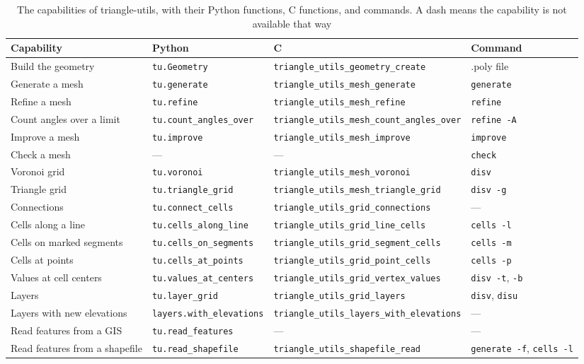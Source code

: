 \documentclass[11pt,twoside,twocolumn]{usgsreport}
\begin{document}
\begin{table}[htbp]
  \centering
  \caption{The capabilities of triangle-utils, with their Python functions, C functions, and commands. A dash means the capability is not available that way}
  \label{tab:reference}
  \small
  \begin{tabular}{llll}
    \hline
    Capability & Python & C & Command \\
    \hline
    Build the geometry & \texttt{tu.Geometry} & \texttt{triangle\_utils\_geometry\_create} & .poly file \\
    Generate a mesh & \texttt{tu.generate} & \texttt{triangle\_utils\_mesh\_generate} & \texttt{generate} \\
    Refine a mesh & \texttt{tu.refine} & \texttt{triangle\_utils\_mesh\_refine} & \texttt{refine} \\
    Count angles over a limit & \texttt{tu.count\_angles\_over} & \texttt{triangle\_utils\_mesh\_count\_angles\_over} & \texttt{refine -A} \\
    Improve a mesh & \texttt{tu.improve} & \texttt{triangle\_utils\_mesh\_improve} & \texttt{improve} \\
    Check a mesh & --- & --- & \texttt{check} \\
    Voronoi grid & \texttt{tu.voronoi} & \texttt{triangle\_utils\_mesh\_voronoi} & \texttt{disv} \\
    Triangle grid & \texttt{tu.triangle\_grid} & \texttt{triangle\_utils\_mesh\_triangle\_grid} & \texttt{disv -g} \\
    Connections & \texttt{tu.connect\_cells} & \texttt{triangle\_utils\_grid\_connections} & --- \\
    Cells along a line & \texttt{tu.cells\_along\_line} & \texttt{triangle\_utils\_grid\_line\_cells} & \texttt{cells -l} \\
    Cells on marked segments & \texttt{tu.cells\_on\_segments} & \texttt{triangle\_utils\_grid\_segment\_cells} & \texttt{cells -m} \\
    Cells at points & \texttt{tu.cells\_at\_points} & \texttt{triangle\_utils\_grid\_point\_cells} & \texttt{cells -p} \\
    Values at cell centers & \texttt{tu.values\_at\_centers} & \texttt{triangle\_utils\_grid\_vertex\_values} & \texttt{disv -t}, \texttt{-b} \\
    Layers & \texttt{tu.layer\_grid} & \texttt{triangle\_utils\_grid\_layers} & \texttt{disv}, \texttt{disu} \\
    Layers with new elevations & \texttt{layers.with\_elevations} & \texttt{triangle\_utils\_layers\_with\_elevations} & --- \\
    Read features from a GIS & \texttt{tu.read\_features} & --- & --- \\
    Read features from a shapefile & \texttt{tu.read\_shapefile} & \texttt{triangle\_utils\_shapefile\_read} & \texttt{generate -f}, \texttt{cells -l} \\
    \hline
  \end{tabular}
\end{table}
\end{document}
